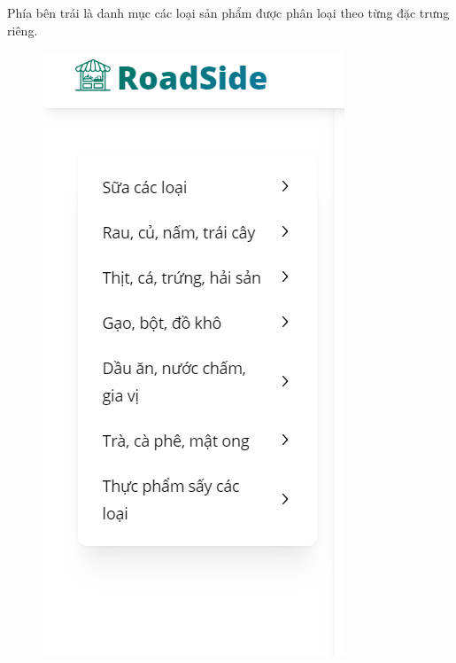 Phía bên trái là danh mục các loại sản phẩm được phân loại theo từng đặc trưng riêng.
\begin{figure}[H]
    \centering
    \includegraphics[scale=0.7] {Images/UI/category1.png}

\end{figure}
